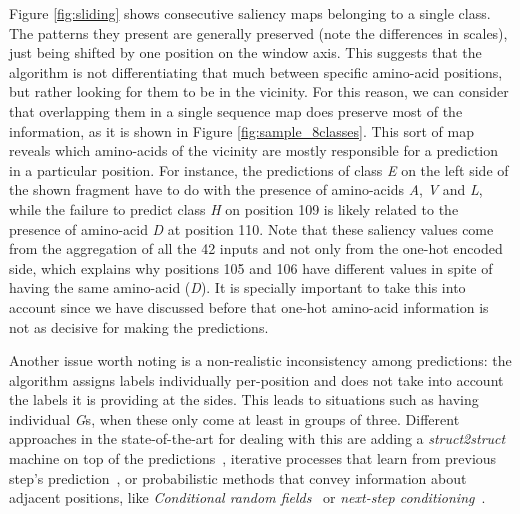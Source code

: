 		
	
	Figure \ref{fig:sliding} shows consecutive saliency maps belonging to a single class. The patterns they present are generally preserved (note the differences in scales), just being shifted by one position on the window axis. This suggests that the algorithm is not differentiating that much between specific amino-acid positions, but rather looking for them to be in the vicinity. For this reason, we can consider that overlapping them in a single sequence map does preserve most of the information, as it is shown in Figure \ref{fig:sample_8classes}. This sort of map reveals which amino-acids of the vicinity are mostly responsible for a prediction in a particular position. For instance, the  predictions of class \textit{E} on the left side of the shown fragment have to do with the presence of amino-acids \textit{A}, \textit{V} and \textit{L}, while the failure to predict class \textit{H} on position 109 is likely related to the presence of amino-acid \textit{D} at position 110. Note that these saliency values come from the aggregation of all the 42 inputs and not only from the one-hot encoded side, which explains why positions 105 and 106 have different values in spite of having the same amino-acid (\textit{D}). It is specially important to take this into account since we have discussed before that one-hot amino-acid information is not as decisive for making the predictions.
	
	Another issue worth noting is a non-realistic inconsistency among predictions: the algorithm assigns labels individually per-position and does not take into account the labels it is providing at the sides. This leads to situations such as having individual \textit{G}s, when these only come at least in groups of three. Different approaches in the state-of-the-art for dealing with this are adding a \textit{struct2struct} machine on top of the predictions~\cite{Rost1993,Fang2017}, iterative processes that learn from previous step's prediction~\cite{Heffernan2017}, or probabilistic methods that convey information about adjacent positions, like \textit{Conditional random fields}~\cite{Wang2016} or \textit{next-step conditioning}~\cite{Busia2017}.
	
